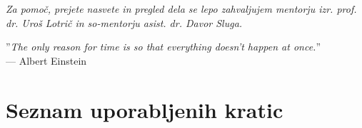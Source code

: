 






\clearemptydoublepage

\thispagestyle{empty}\mbox{}\vfill\null\it%
\noindent
Za pomoč, prejete nasvete in pregled dela se lepo zahvaljujem mentorju izr. prof. dr. Uroš Lotrič in so-mentorju asist. dr. Davor Sluga.
\rm\normalfont

\clearemptydoublepage

\thispagestyle{empty}\mbox{}{\textheight}\mbox{}\hfill\begin{minipage}{0.55\textwidth}%
”\emph{The only reason for time is so that everything
doesn’t happen at once.}”\\
— Albert Einstein
\normalfont\end{minipage}

\clearemptydoublepage


\pagestyle{empty}
\def\thepage{}%
\tableofcontents{}


\clearemptydoublepage

\chapter*{Seznam uporabljenih kratic}



\clearemptydoublepage


